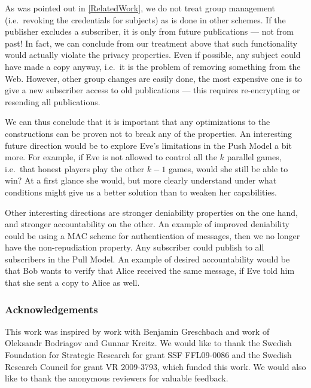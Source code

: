 As was pointed out in \cref{RelatedWork}, we do not treat group management 
(i.e.\ revoking the credentials for subjects) as is done in other schemes.
If the publisher excludes a subscriber, it is only from future publications ---
not from past!
In fact, we can conclude from our treatment above that such functionality would 
actually violate the privacy properties.
Even if possible, any subject could have made a copy anyway, i.e.\ it is the 
problem of removing something from the Web.
However, other group changes are easily done, the most expensive one is to give
a new subscriber access to old publications --- this requires re-encrypting or 
resending all publications.

We can thus conclude that it is important that any optimizations to the 
constructions can be proven not to break any of the properties.
An interesting future direction would be to explore Eve's limitations in the 
Push Model a bit more.
For example, if Eve is not allowed to control all the \(k\) parallel games, 
i.e.\ that honest players play the other \(k-1\) games, would she still be able
to win?
At a first glance she would, but more clearly understand under what conditions 
might give us a better solution than to weaken her capabilities.

Other interesting directions are stronger deniability properties on the one 
hand, and stronger accountability on the other.
An example of improved deniability could be using a \ac{MAC} scheme for 
authentication of messages, then we no longer have the non-repudiation 
property.
Any subscriber could publish to all subscribers in the Pull Model.
An example of desired accountability would be that Bob wants to verify that 
Alice received the same message, if Eve told him that she sent a copy to Alice 
as well.


\subsubsection{Acknowledgements}

This work was inspired by work with Benjamin Greschbach and work of Oleksandr 
Bodriagov and Gunnar Kreitz.
We would like to thank the Swedish Foundation for Strategic Research for grant 
SSF FFL09-0086 and the Swedish Research Council for grant VR 2009-3793, which 
funded this work.
We would also like to thank the anonymous reviewers for valuable feedback.

\begin{frame}
\printbibliography{}
\end{frame}


\appendix

